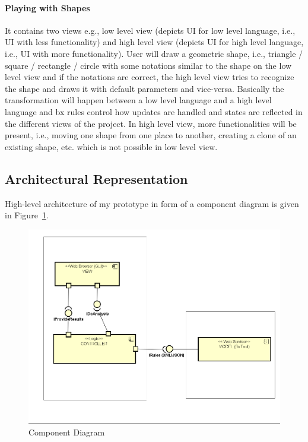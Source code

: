 \paragraph{Playing with Shapes} It contains two views e.g., low level view (depicts \ac{UI} for low level language, i.e., UI with less functionality) and high level view (depicts UI for high level language, i.e., UI with more functionality). User will draw a geometric shape, i.e., triangle / square / rectangle / circle with some notations similar to the shape on the low level view and if the notations are correct, the high level view tries to recognize the shape and draws it with default parameters and vice-versa. Basically the transformation will happen between a low level language and a high level language and bx rules control how updates are handled and states are reflected in the different views of the project. In high level view, more functionalities will be present, i.e., moving one shape from one place to another, creating a clone of an existing shape, etc. which is not possible in low level view.

\subsection{Architectural Representation}\label{subsec:archirep}
High-level architecture of my prototype in form of a component diagram  is given in Figure~\ref{fig:Component_Diagram}.
\begin{figure}
	\includegraphics[width=1\textwidth]{figures/Component_Diagram}
	\caption{Component Diagram}
	\label{fig:Component_Diagram}
\end{figure}

